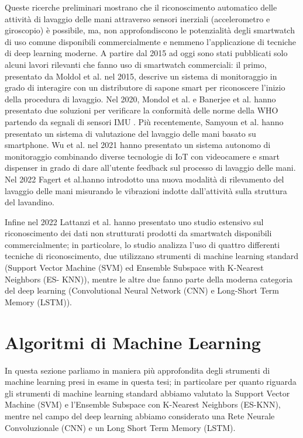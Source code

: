 Queste ricerche preliminari mostrano che il riconoscimento automatico delle attività di lavaggio delle mani attraverso sensori inerziali (accelerometro e giroscopio) è possibile, ma, 
non approfondiscono le potenzialità degli smartwatch di uso comune disponibili commercialmente e nemmeno l'applicazione di tecniche di deep learning moderne.
A partire dal 2015 ad oggi sono stati pubblicati solo alcuni lavori rilevanti che fanno uso di smartwatch commerciali: il primo, presentato da Moldol et al. nel 2015, descrive
un sistema di monitoraggio in grado di interagire con un distributore di sapone smart per riconoscere l'inizio della procedura di lavaggio\cite{mondol2015harmony}. Nel 2020, Mondol et al. e Banerjee et al. 
hanno presentato due soluzioni per verificare la conformità delle norme della WHO partendo da segnali di sensori IMU \cite{mondol2020hawad}\cite{banerjee2020hand}. Più recentemente, Samyoun et al. hanno 
presentato un sistema di valutazione del lavaggio delle mani basato su smartphone\cite{samyoun2021iwash}. Wu et al. nel 2021 hanno presentato un sistema autonomo di monitoraggio combinando diverse tecnologie 
di IoT con videocamere e smart dispenser in grado di dare all'utente feedback sul processo di lavaggio delle mani. Nel 2022 Fagert et al.hanno introdotto una nuova modalità di rilevamento del 
lavaggio delle mani misurando le vibrazioni indotte dall'attività sulla struttura del lavandino\cite{fagert2022clean}.

Infine nel 2022 Lattanzi et al. hanno presentato uno studio estensivo sul riconoscimento dei dati non strutturati prodotti da smartwatch disponibili commercialmente\cite{lattanzi2022unstructured}; in particolare, 
lo studio analizza l'uso di quattro differenti tecniche di riconoscimento, due utilizzano strumenti di machine learning standard (Support Vector Machine (SVM) ed Ensemble Subspace with K-Nearest Neighbors (ES- KNN)), 
mentre le altre due fanno parte della moderna categoria del deep learning (Convolutional Neural Network (CNN) e Long-Short Term Memory (LSTM)).

\section{Algoritmi di Machine Learning}

In questa sezione parliamo in maniera più approfondita degli strumenti di machine learning presi in esame in questa tesi; in particolare per quanto riguarda gli strumenti di machine learning 
standard abbiamo valutato la Support Vector Machine (SVM) e l'Ensemble Subspace con K-Nearest Neighbors (ES-KNN), mentre nel campo del deep learning abbiamo considerato una Rete Neurale Convoluzionale (CNN) 
e un Long Short Term Memory (LSTM).

